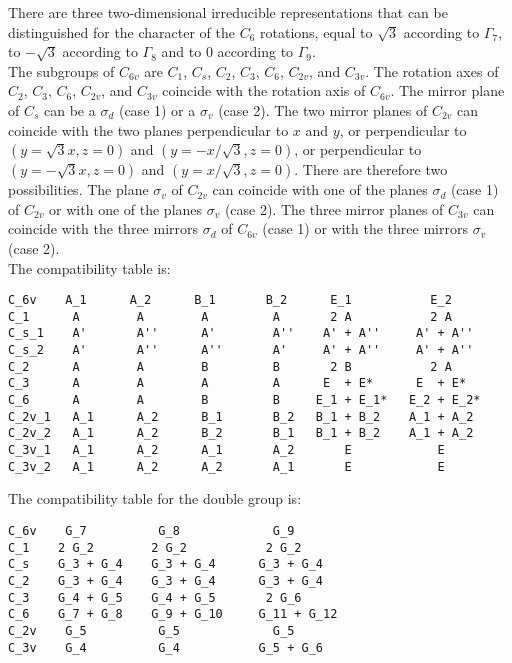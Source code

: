 \documentclass[12pt,a4paper]{article}
\begin{document}
There are three two-dimensional irreducible representations that can be 
distinguished for the character of the $C_6$ rotations, equal to $\sqrt{3}$
according to $\Gamma_7$, to $-\sqrt{3}$ according to $\Gamma_8$ and to
$0$ according to $\Gamma_9$.\\
The subgroups of $C_{6v}$ are $C_1$, $C_s$, $C_2$, $C_3$, $C_6$,
$C_{2v}$, and $C_{3v}$. The rotation axes of $C_2$, $C_3$, $C_6$, $C_{2v}$,
and $C_{3v}$ coincide with the rotation axis of $C_{6v}$. The mirror 
plane of $C_s$ can be a $\sigma_d$ (case 1) or a $\sigma_v$ (case 2). The two 
mirror planes of $C_{2v}$
can coincide with the two planes perpendicular to $x$ and $y$, 
or perpendicular to $(y=\sqrt{3} x, z=0)$ and $(y=-x /\sqrt{3}, z=0)$,
or perpendicular to $(y=-\sqrt{3} x, z=0)$ and $(y=x /\sqrt{3}, z=0)$.
There are therefore two possibilities. The plane $\sigma_v$ of $C_{2v}$
can coincide with one of the planes $\sigma_d$ (case 1) of $C_{2v}$
or with one of the planes $\sigma_v$ (case 2).
The three mirror planes of $C_{3v}$ can coincide with the three mirrors 
$\sigma_d$ of $C_{6v}$ (case 1) or with the three mirrors $\sigma_v$ (case 2).\\
The compatibility table is:
\begin{verbatim}
C_6v    A_1      A_2      B_1       B_2      E_1           E_2
C_1      A        A        A         A       2 A           2 A
C_s_1    A'       A''      A'        A''    A' + A''     A' + A''
C_s_2    A'       A''      A''       A'     A' + A''     A' + A''
C_2      A        A        B         B       2 B           2 A
C_3      A        A        A         A      E  + E*      E  + E*
C_6      A        A        B         B     E_1 + E_1*   E_2 + E_2*
C_2v_1   A_1      A_2      B_1       B_2   B_1 + B_2    A_1 + A_2
C_2v_2   A_1      A_2      B_2       B_1   B_1 + B_2    A_1 + A_2
C_3v_1   A_1      A_2      A_1       A_2       E            E  
C_3v_2   A_1      A_2      A_2       A_1       E            E
\end{verbatim}
The compatibility table for the double group is:
\begin{verbatim}
C_6v    G_7          G_8             G_9
C_1    2 G_2        2 G_2           2 G_2
C_s    G_3 + G_4    G_3 + G_4      G_3 + G_4
C_2    G_3 + G_4    G_3 + G_4      G_3 + G_4
C_3    G_4 + G_5    G_4 + G_5       2 G_6
C_6    G_7 + G_8    G_9 + G_10     G_11 + G_12
C_2v    G_5          G_5             G_5
C_3v    G_4          G_4           G_5 + G_6
\end{verbatim}

\newpage
\end{document}
